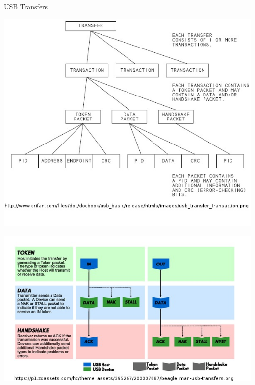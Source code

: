\documentclass[pdf]{beamer}
\begin{document}
\begin{frame}{USB Transfers}
  \begin{minipage}{.45\linewidth}
    \includegraphics[scale=0.25]{img/usb_transfer.jpg}
  \end{minipage}
  \hspace{.05\linewidth}
  \begin{minipage}{.45\linewidth}
    \includegraphics[scale=0.3]{img/usb_transaction.jpg}
  \end{minipage}
\end{frame}
\end{document}
